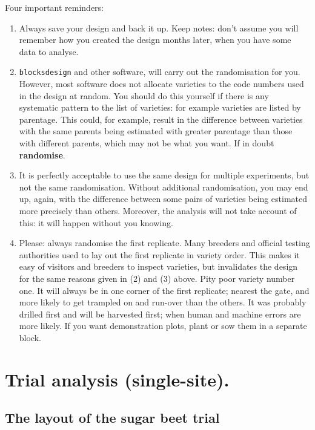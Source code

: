 \documentclass[
]{book}
\begin{document}
Four important reminders:

\begin{enumerate}
\def\labelenumi{\arabic{enumi}.}
\item
  Always save your design and back it up. Keep notes: don't assume you will remember how you created the design months later, when you have some data to analyse.
\item
  \texttt{blocksdesign} and other software, will carry out the randomisation for you. However, most software does not allocate varieties to the code numbers used in the design at random. You should do this yourself if there is any systematic pattern to the list of varieties: for example varieties are listed by parentage. This could, for example, result in the difference between varieties with the same parents being estimated with greater parentage than those with different parents, which may not be what you want. If in doubt \textbf{randomise}.
\item
  It is perfectly acceptable to use the same design for multiple experiments, but not the same randomisation. Without additional randomisation, you may end up, again, with the difference between some pairs of varieties being estimated more precisely than others. Moreover, the analysis will not take account of this: it will happen without you knowing.
\item
  Please: always randomise the first replicate. Many breeders and official testing authorities used to lay out the first replicate in variety order. This makes it easy of visitors and breeders to inspect varieties, but invalidates the design for the same reasons given in (2) and (3) above. Pity poor variety number one. It will always be in one corner of the first replicate; nearest the gate, and more likely to get trampled on and run-over than the others. It was probably drilled first and will be harvested first; when human and machine errors are more likely. If you want demonstration plots, plant or sow them in a separate block.
\end{enumerate}

\hypertarget{Trial-analysis}{%
\chapter{Trial analysis (single-site).}\label{Trial-analysis}}

\hypertarget{the-layout-of-the-sugar-beet-trial}{%
\section{The layout of the sugar beet trial}\label{the-layout-of-the-sugar-beet-trial}}
\end{document}
